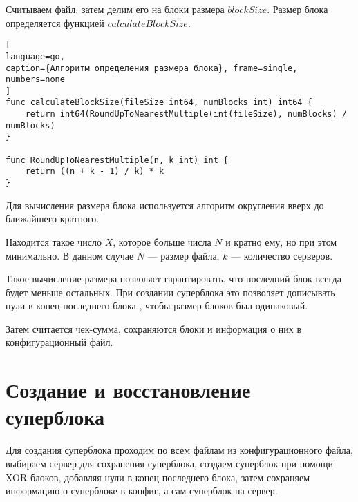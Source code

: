 \newpage

Считываем файл, затем делим его на блоки размера $blockSize$. 
Размер блока определяется функцией $calculateBlockSize$.  
\begin{lstlisting}[
language=go, 
caption={Алгоритм определения размера блока}, frame=single,	numbers=none
]
func calculateBlockSize(fileSize int64, numBlocks int) int64 {
	return int64(RoundUpToNearestMultiple(int(fileSize), numBlocks) / numBlocks)
}

func RoundUpToNearestMultiple(n, k int) int {
	return ((n + k - 1) / k) * k
}
\end{lstlisting}

Для вычисления размера блока используется алгоритм округления вверх до ближайшего кратного.

Находится такое число $X$, которое больше числа $N$ и кратно ему, но при этом минимально. В данном случае $N$ ---  размер файла, $k$ --- количество серверов. 

Такое вычисление размера позволяет гарантировать, что последний блок всегда будет меньше остальных. При создании суперблока это позволяет дописывать нули в конец последнего блока , чтобы размер блоков был одинаковый. 

Затем считается чек-сумма, сохраняются блоки и информация о них в конфигурационный файл. 

\newpage
{}
\newpage

\newpage
\section{Создание и восстановление суперблока}
Для создания суперблока проходим по всем файлам из конфигурационного файла, выбираем сервер для сохранения суперблока, создаем суперблок при помощи XOR блоков, добавляя нули в конец последнего блока, затем сохраняем информацию о суперблоке в конфиг, а сам суперблок на сервер.   

\newpage
{}

